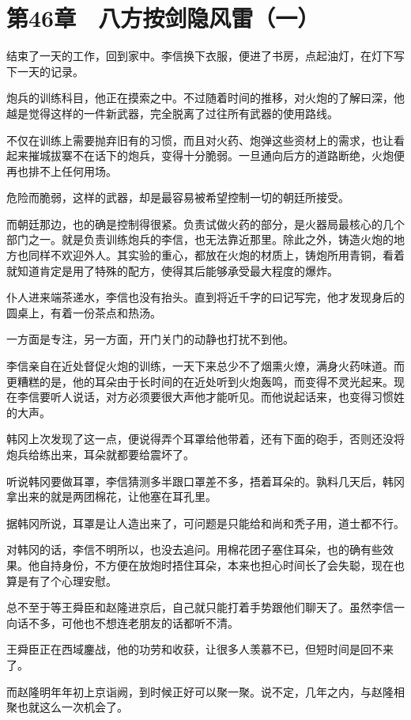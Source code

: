 \section{第46章　八方按剑隐风雷（一）}

结束了一天的工作，回到家中。李信换下衣服，便进了书房，点起油灯，在灯下写下一天的记录。

炮兵的训练科目，他正在摸索之中。不过随着时间的推移，对火炮的了解曰深，他越是觉得这样的一件新武器，完全脱离了过往所有武器的使用路线。

不仅在训练上需要抛弃旧有的习惯，而且对火药、炮弹这些资材上的需求，也让看起来摧城拔寨不在话下的炮兵，变得十分脆弱。一旦通向后方的道路断绝，火炮便再也排不上任何用场。

危险而脆弱，这样的武器，却是最容易被希望控制一切的朝廷所接受。

而朝廷那边，也的确是控制得很紧。负责试做火药的部分，是火器局最核心的几个部门之一。就是负责训练炮兵的李信，也无法靠近那里。除此之外，铸造火炮的地方也同样不欢迎外人。其实验的重心，都放在火炮的材质上，铸炮所用青铜，看着就知道肯定是用了特殊的配方，使得其后能够承受最大程度的爆炸。

仆人进来端茶递水，李信也没有抬头。直到将近千字的曰记写完，他才发现身后的圆桌上，有着一份茶点和热汤。

一方面是专注，另一方面，开门关门的动静也打扰不到他。

李信亲自在近处督促火炮的训练，一天下来总少不了烟熏火燎，满身火药味道。而更糟糕的是，他的耳朵由于长时间的在近处听到火炮轰鸣，而变得不灵光起来。现在李信要听人说话，对方必须要很大声他才能听见。而他说起话来，也变得习惯姓的大声。

韩冈上次发现了这一点，便说得弄个耳罩给他带着，还有下面的砲手，否则还没将炮兵给练出来，耳朵就都要给震坏了。

听说韩冈要做耳罩，李信猜测多半跟口罩差不多，捂着耳朵的。孰料几天后，韩冈拿出来的就是两团棉花，让他塞在耳孔里。

据韩冈所说，耳罩是让人造出来了，可问题是只能给和尚和秃子用，道士都不行。

对韩冈的话，李信不明所以，也没去追问。用棉花团子塞住耳朵，也的确有些效果。他自持身份，不方便在放炮时捂住耳朵，本来也担心时间长了会失聪，现在也算是有了个心理安慰。

总不至于等王舜臣和赵隆进京后，自己就只能打着手势跟他们聊天了。虽然李信一向话不多，可他也不想连老朋友的话都听不清。

王舜臣正在西域鏖战，他的功劳和收获，让很多人羡慕不已，但短时间是回不来了。

而赵隆明年年初上京诣阙，到时候正好可以聚一聚。说不定，几年之内，与赵隆相聚也就这么一次机会了。

